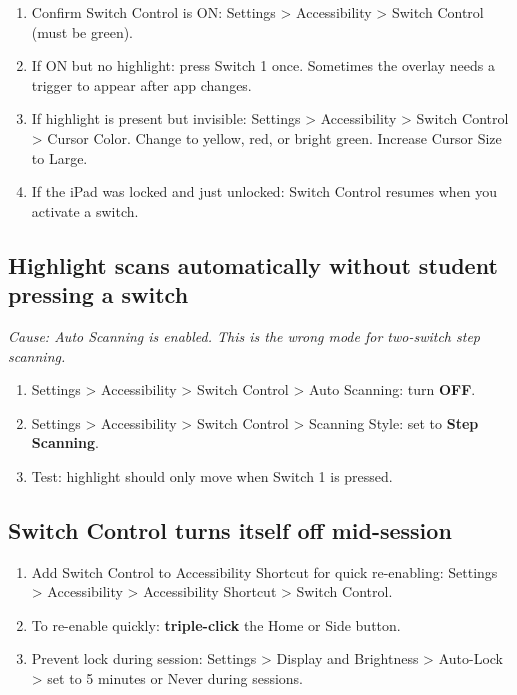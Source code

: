 \documentclass[justified,openright]{tufte-book}
\begin{document}
\begin{enumerate}
\item
  Confirm Switch Control is ON: Settings \textgreater{} Accessibility
  \textgreater{} Switch Control (must be green).
\item
  If ON but no highlight: press Switch 1 once. Sometimes the overlay
  needs a trigger to appear after app changes.
\item
  If highlight is present but invisible: Settings \textgreater{}
  Accessibility \textgreater{} Switch Control \textgreater{} Cursor
  Color. Change to yellow, red, or bright green. Increase Cursor Size to
  Large.
\item
  If the iPad was locked and just unlocked: Switch Control resumes when
  you activate a switch.
\end{enumerate}

\subsection{Highlight scans automatically without student pressing a
switch}\label{highlight-scans-automatically-without-student-pressing-a-switch}

\emph{Cause: Auto Scanning is enabled. This is the wrong mode for
two-switch step scanning.}

\begin{enumerate}
\item
  Settings \textgreater{} Accessibility \textgreater{} Switch Control
  \textgreater{} Auto Scanning: turn \textbf{OFF}.
\item
  Settings \textgreater{} Accessibility \textgreater{} Switch Control
  \textgreater{} Scanning Style: set to \textbf{Step Scanning}.
\item
  Test: highlight should only move when Switch 1 is pressed.
\end{enumerate}

\subsection{Switch Control turns itself off
mid-session}\label{switch-control-turns-itself-off-mid-session}

\begin{enumerate}
\item
  Add Switch Control to Accessibility Shortcut for quick re-enabling:
  Settings \textgreater{} Accessibility \textgreater{} Accessibility
  Shortcut \textgreater{} Switch Control.
\item
  To re-enable quickly: \textbf{triple-click} the Home or Side button.
\item
  Prevent lock during session: Settings \textgreater{} Display and
  Brightness \textgreater{} Auto-Lock \textgreater{} set to 5 minutes or
  Never during sessions.
\end{enumerate}
\end{document}
